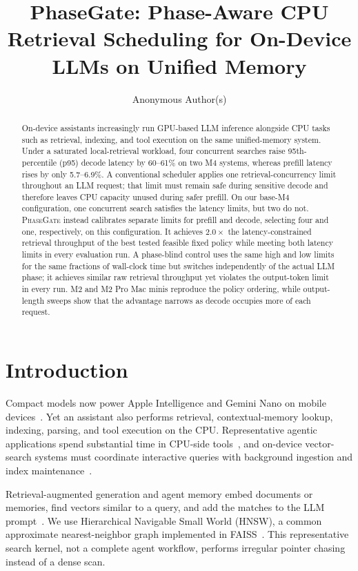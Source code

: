 \documentclass{article}
\title{PhaseGate: Phase-Aware CPU Retrieval Scheduling for On-Device LLMs on Unified Memory}
\author{Anonymous Author(s)}
\newcommand{\system}{\textsc{PhaseGate}\xspace}
\begin{document}
\maketitle

\begin{abstract}
On-device assistants increasingly run GPU-based LLM inference alongside CPU tasks such as retrieval, indexing, and tool execution on the same unified-memory system.
Under a saturated local-retrieval workload, four concurrent searches raise 95th-percentile (p95) decode latency by 60--61\% on two M4 systems, whereas prefill latency rises by only 5.7--6.9\%.
A conventional scheduler applies one retrieval-concurrency limit throughout an LLM request; that limit must remain safe during sensitive decode and therefore leaves CPU capacity unused during safer prefill.
On our base-M4 configuration, one concurrent search satisfies the latency limits, but two do not.
\system instead calibrates separate limits for prefill and decode, selecting four and one, respectively, on this configuration.
It achieves $2.0\times$ the latency-constrained retrieval throughput of the best tested feasible fixed policy while meeting both latency limits in every evaluation run.
A phase-blind control uses the same high and low limits for the same fractions of wall-clock time but switches independently of the actual LLM phase; it achieves similar raw retrieval throughput yet violates the output-token limit in every run.
M2 and M2 Pro Mac minis reproduce the policy ordering, while output-length sweeps show that the advantage narrows as decode occupies more of each request.
\end{abstract}

\section{Introduction}

Compact models now power Apple Intelligence and Gemini Nano on mobile devices~\cite{gunter2024apple,geminiteam2023gemini}.
Yet an assistant also performs retrieval, contextual-memory lookup, indexing, parsing, and tool execution on the CPU.
Representative agentic applications spend substantial time in CPU-side tools~\cite{raj2025cpu}, and on-device vector-search systems must coordinate interactive queries with background ingestion and index maintenance~\cite{zhao2026muse}.

Retrieval-augmented generation and agent memory embed documents or memories, find vectors similar to a query, and add the matches to the LLM prompt~\cite{apple2025rag}.
We use Hierarchical Navigable Small World (HNSW), a common approximate nearest-neighbor graph implemented in FAISS~\cite{malkov2020hnsw,johnson2021faiss}.
This representative search kernel, not a complete agent workflow, performs irregular pointer chasing instead of a dense scan.
\end{document}
